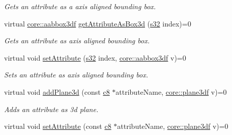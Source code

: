 \begin{DoxyCompactItemize}
\begin{DoxyCompactList}\small\item\em Gets an attribute as a axis aligned bounding box. \end{DoxyCompactList}\item 
virtual \hyperlink{namespaceirr_1_1core_a60f4b4c744aba55f10530d503c6ecb04}{core\+::aabbox3df} \hyperlink{classirr_1_1io_1_1IAttributes_a3da2aafbf1bfe8bcdb7dfa2866a4efe4}{get\+Attribute\+As\+Box3d} (\hyperlink{namespaceirr_ac66849b7a6ed16e30ebede579f9b47c6}{s32} index)=0
\begin{DoxyCompactList}\small\item\em Gets an attribute as axis aligned bounding box. \end{DoxyCompactList}\item 
\mbox{\label{classirr_1_1io_1_1IAttributes_a5384d725e45fa4b8916ecbf64d07b3be}} 
virtual void \hyperlink{classirr_1_1io_1_1IAttributes_a5384d725e45fa4b8916ecbf64d07b3be}{set\+Attribute} (\hyperlink{namespaceirr_ac66849b7a6ed16e30ebede579f9b47c6}{s32} index, \hyperlink{namespaceirr_1_1core_a60f4b4c744aba55f10530d503c6ecb04}{core\+::aabbox3df} v)=0
\begin{DoxyCompactList}\small\item\em Sets an attribute as axis aligned bounding box. \end{DoxyCompactList}\item 
\mbox{\label{classirr_1_1io_1_1IAttributes_a567d22135378c1da552f480e0ca90d43}} 
virtual void \hyperlink{classirr_1_1io_1_1IAttributes_a567d22135378c1da552f480e0ca90d43}{add\+Plane3d} (const \hyperlink{namespaceirr_a9395eaea339bcb546b319e9c96bf7410}{c8} $\ast$attribute\+Name, \hyperlink{namespaceirr_1_1core_a97c9b39d4c6f71dbd9ded0153c4fa7f7}{core\+::plane3df} v)=0
\begin{DoxyCompactList}\small\item\em Adds an attribute as 3d plane. \end{DoxyCompactList}\item 
\mbox{\label{classirr_1_1io_1_1IAttributes_a6a4cb4cb9c5296fc05892f0821009609}} 
virtual void \hyperlink{classirr_1_1io_1_1IAttributes_a6a4cb4cb9c5296fc05892f0821009609}{set\+Attribute} (const \hyperlink{namespaceirr_a9395eaea339bcb546b319e9c96bf7410}{c8} $\ast$attribute\+Name, \hyperlink{namespaceirr_1_1core_a97c9b39d4c6f71dbd9ded0153c4fa7f7}{core\+::plane3df} v)=0

\end{DoxyCompactItemize}
